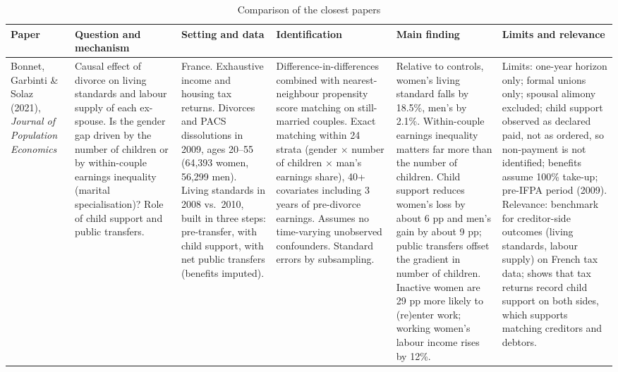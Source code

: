 \documentclass{article}
\begin{document}
\begin{landscape}
\begin{table}[p]
\centering
\scriptsize
\renewcommand{\arraystretch}{1.3}
\caption{Comparison of the closest papers}
\label{tab:litreview}
\begin{tabularx}{\linewidth}{@{} >{\raggedright\arraybackslash}p{2.6cm} Y Y Y Y Y @{}}
\toprule
\textbf{Paper} & \textbf{Question and mechanism} & \textbf{Setting and data} & \textbf{Identification} & \textbf{Main finding} & \textbf{Limits and relevance} \\
\midrule
Bonnet, Garbinti \& Solaz (2021), \textit{Journal of Population Economics}
&
Causal effect of divorce on living standards and labour supply of each ex-spouse. Is the gender gap driven by the number of children or by within-couple earnings inequality (marital specialisation)? Role of child support and public transfers.
&
France. Exhaustive income and housing tax returns. Divorces and PACS dissolutions in 2009, ages 20--55 (64,393 women, 56,299 men). Living standards in 2008 vs.\ 2010, built in three steps: pre-transfer, with child support, with net public transfers (benefits imputed).
&
Difference-in-differences combined with nearest-neighbour propensity score matching on still-married couples. Exact matching within 24 strata (gender $\times$ number of children $\times$ man's earnings share), 40+ covariates including 3 years of pre-divorce earnings. Assumes no time-varying unobserved confounders. Standard errors by subsampling.
&
Relative to controls, women's living standard falls by 18.5\%, men's by 2.1\%. Within-couple earnings inequality matters far more than the number of children. Child support reduces women's loss by about 6 pp and men's gain by about 9 pp; public transfers offset the gradient in number of children. Inactive women are 29 pp more likely to (re)enter work; working women's labour income rises by 12\%.
&
Limits: one-year horizon only; formal unions only; spousal alimony excluded; child support observed as declared paid, not as ordered, so non-payment is not identified; benefits assume 100\% take-up; pre-IFPA period (2009).
Relevance: benchmark for creditor-side outcomes (living standards, labour supply) on French tax data; shows that tax returns record child support on both sides, which supports matching creditors and debtors.
\\
\bottomrule
\end{tabularx}
\end{table}
\end{landscape}
\end{document}
